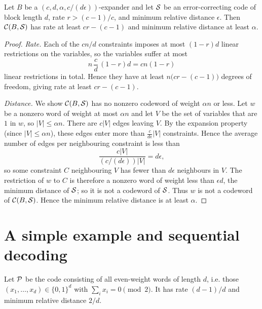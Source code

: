 \begin{theorem}
  \label{thm:rate-distance}
  Let $B$ be a $(c,d,\alpha,c/(d\epsilon))$-expander and let $\mathcal{S}$ be an
  error-correcting code of block length $d$, rate $r > (c-1)/c$, and minimum
  relative distance $\epsilon$. Then $\mathcal{C}(B,\mathcal{S})$ has rate at least
  $cr-(c-1)$ and minimum relative distance at least $\alpha$.
\end{theorem}
\begin{proof}
  \emph{Rate.} Each of the $cn/d$ constraints imposes at most $(1-r)d$ linear
  restrictions on the variables, so the variables suffer at most
  \[
    n\,\frac{c}{d}\,(1-r)d = cn(1-r)
  \]
  linear restrictions in total. Hence they have at least
  $n\bigl(cr-(c-1)\bigr)$ degrees of freedom, giving rate at least $cr-(c-1)$.

  \emph{Distance.} We show $\mathcal{C}(B,\mathcal{S})$ has no nonzero codeword of weight
  $\alpha n$ or less. Let $w$ be a nonzero word of weight at most $\alpha n$ and
  let $V$ be the set of variables that are $1$ in $w$, so $|V| \le \alpha n$.
  There are $c|V|$ edges leaving $V$. By the expansion property (since
  $|V| \le \alpha n$), these edges enter more than $\frac{c}{d\epsilon}|V|$
  constraints. Hence the average number of edges per neighbouring constraint is
  less than
  \[
    \frac{c|V|}{(c/(d\epsilon))|V|} = d\epsilon,
  \]
  so some constraint $C$ neighbouring $V$ has fewer than $d\epsilon$ neighbours
  in $V$. The restriction of $w$ to $C$ is therefore a nonzero word of weight
  less than $\epsilon d$, the minimum distance of $\mathcal{S}$; so it is not a codeword
  of $\mathcal{S}$. Thus $w$ is not a codeword of $\mathcal{C}(B,\mathcal{S})$. Hence the minimum
  relative distance is at least $\alpha$.
\end{proof}

\chapter{A simple example and sequential decoding}


\begin{definition}
  \label{def:parity-code}
  Let $\mathcal{P}$ be the code consisting of all even-weight words of length $d$, i.e.
  those $(x_1,\dots,x_d) \in \{0,1\}^d$ with $\sum_i x_i = 0 \pmod 2$. It has
  rate $(d-1)/d$ and minimum relative distance $2/d$.
\end{definition}

